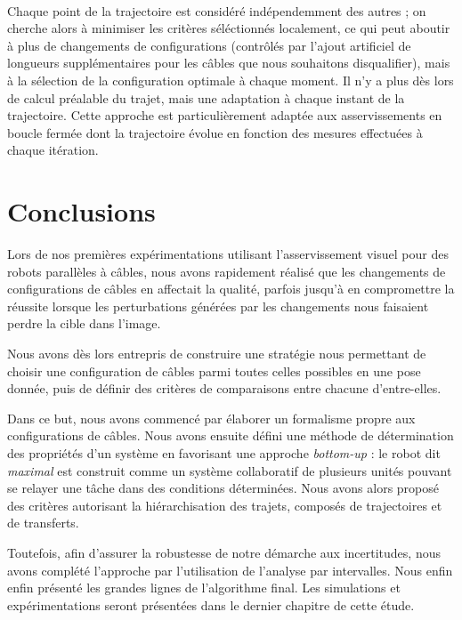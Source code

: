 \\

Chaque point de la trajectoire est consid\'er\'e ind\'ependemment des autres ; 
on cherche alors \`a minimiser les crit\`eres s\'el\'ectionn\'es localement, ce 
qui peut aboutir \`a plus de changements de configurations (contr\^ol\'es par 
l'ajout artificiel de longueurs suppl\'ementaires pour les c\^ables que nous 
souhaitons disqualifier), mais \`a la s\'election de la configuration optimale 
\`a chaque moment. Il n'y a plus d\`es lors de calcul pr\'ealable du trajet, 
mais une adaptation \`a chaque instant de la trajectoire. Cette approche est 
particuli\`erement adapt\'ee aux asservissements en boucle ferm\'ee dont la 
trajectoire \'evolue en fonction des mesures effectu\'ees \`a chaque 
it\'eration. 

\section{Conclusions}

Lors de nos premi\`eres exp\'erimentations utilisant l'asservissement visuel 
pour des robots parall\`eles \`a c\^ables, nous avons rapidement r\'ealis\'e 
que les changements de configurations de c\^ables en affectait la qualit\'e, 
parfois jusqu'\`a en compromettre la r\'eussite lorsque les perturbations 
g\'en\'er\'ees par les changements nous faisaient perdre la cible dans l'image.

Nous avons d\`es lors entrepris de construire une strat\'egie nous permettant 
de choisir une configuration de c\^ables parmi toutes celles possibles en une 
pose donn\'ee, puis de d\'efinir des crit\`eres de comparaisons entre chacune 
d'entre-elles.

Dans ce but, nous avons commenc\'e par \'elaborer un formalisme propre aux 
configurations de c\^ables. Nous avons ensuite d\'efini une m\'ethode de 
d\'etermination des propri\'et\'es d'un syst\`eme en favorisant une approche 
{\it bottom-up} : le robot dit {\it maximal} est construit comme un syst\`eme 
collaboratif de plusieurs unit\'es pouvant se relayer une t\^ache dans des
conditions d\'etermin\'ees. Nous avons alors propos\'e des crit\`eres 
autorisant la hi\'erarchisation des trajets, compos\'es de trajectoires et de 
transferts.

Toutefois, afin d'assurer la robustesse de notre d\'emarche aux incertitudes, 
nous avons compl\'et\'e l'approche par l'utilisation de l'analyse par 
intervalles. Nous enfin enfin pr\'esent\'e les grandes lignes de l'algorithme 
final. Les simulations et exp\'erimentations seront pr\'esent\'ees dans le 
dernier chapitre de cette \'etude.